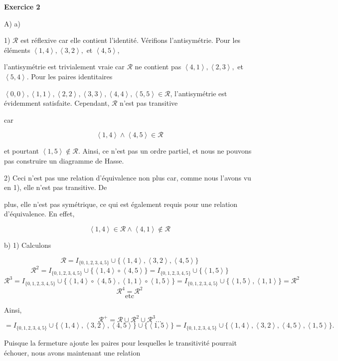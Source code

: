 \documentclass{article}
\newcommand{\tuple}[1]{\ensuremath{\left\langle #1 \right\rangle}}
\begin{document}
    
\textbf{Exercice 2}

\vspace{0.3cm}
A) a) 

1) $\mathcal{R}$ est réflexive car elle contient l'identité. Vérifions l'antisymétrie. Pour les éléments $\tuple{1,4}, \tuple{3,2},$ et $\tuple{4,5}$, 

l'antisymétrie est trivialement vraie car $\mathcal{R}$ ne contient pas $\tuple{4,1}, \tuple{2,3},$ et $\tuple{5,4}$. Pour les paires identitaires 

$\tuple{0, 0},\tuple{1, 1}, \tuple{2, 2}, \tuple{3, 3}, \tuple{4, 4}, \tuple{5, 5} \in \mathcal{R}$, l'antisymétrie est évidemment satisfaite. Cependant, $\mathcal{R}$ n'est pas transitive 

car 

$$ \tuple{1,4} \land \tuple{4,5} \in \mathcal{R}$$

et pourtant $ \tuple{1,5} \notin \mathcal{R}.$ Ainsi, ce n'est pas un ordre partiel, et nous ne pouvons pas construire un diagramme de Hasse.

\vspace{0.3cm}

2)
Ceci n'est pas une relation d'équivalence non plus car, comme nous l'avons vu en 1), elle n'est pas transitive. De 

plus, elle n'est pas symétrique, ce qui est également requis pour une relation d'équivalence. En effet,

$$ \tuple{1,4} \in \mathcal{R} \land \tuple{4,1} \notin \mathcal{R}$$

\vspace{0.3cm}

b) 1) Calculons 

$$ \mathcal{R} = I_{\{0,1,2,3,4,5\}} \cup \{ \tuple{1,4},\tuple{3,2},\tuple{4,5} \}$$
$$\mathcal{R}^2 = I_{\{0,1,2,3,4,5\}} \cup\{ \tuple{1,4} \circ \tuple{4,5} \} = I_{\{0,1,2,3,4,5\}} \cup \{ \tuple{1,5} \}$$
$$\mathcal{R}^3 =  I_{\{0,1,2,3,4,5\}} \cup\{ \tuple{1,4} \circ \tuple{4,5}, \tuple{1,1} \circ \tuple{1,5} \} = I_{\{0,1,2,3,4,5\}} \cup\{ \tuple{1,5} ,\tuple{1,1} \}= \mathcal{R}^2$$
$$\mathcal{R}^4 =  \mathcal{R}^2$$
$$\text{etc}$$

Ainsi, $$ \mathcal{R}^+ = \mathcal{R} \cup \mathcal{R}^2 \cup \mathcal{R}^3 ...$$
$$ = I_{\{0,1,2,3,4,5\}} \cup \{ \tuple{1,4},\tuple{3,2},\tuple{4,5} \} \cup \{ \tuple{1,5} \} = I_{\{0,1,2,3,4,5\}} \cup \{ \tuple{1,4},\tuple{3,2},\tuple{4,5} , \tuple{1,5}\}.$$

Puisque la fermeture ajoute les paires pour lesquelles le transitivité pourrait échouer, nous avons maintenant une relation
\end{document}
